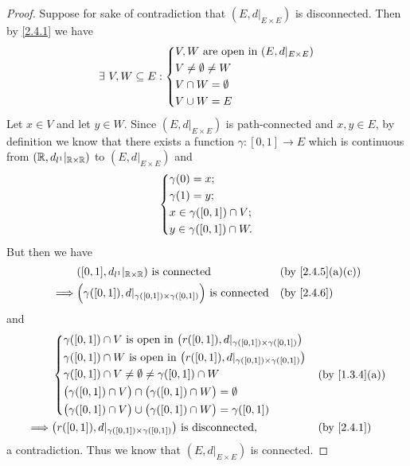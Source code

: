 \begin{proof}
  Suppose for sake of contradiction that \((E, d|_{E \times E})\) is disconnected.
  Then by \cref{2.4.1} we have
  \[
    \exists\ V, W \subseteq E : \begin{dcases}
      V, W \text{ are open in } (E, d|_{E \times E}) \\
      V \neq \emptyset \neq W                        \\
      V \cap W = \emptyset                           \\
      V \cup W = E
    \end{dcases}
  \]
  Let \(x \in V\) and let \(y \in W\).
  Since \((E, d|_{E \times E})\) is path-connected and \(x, y \in E\), by definition we know that there exists a function \(\gamma : [0, 1] \to E\) which is continuous from \((\mathbb{R}, d_{l^1}|_{\mathbb{R} \times \mathbb{R}})\) to \((E, d|_{E \times E})\) and
  \[
    \begin{dcases}
      \gamma(0) = x;               \\
      \gamma(1) = y;               \\
      x \in \gamma([0, 1]) \cap V; \\
      y \in \gamma([0, 1]) \cap W.
    \end{dcases}
  \]
  But then we have
  \begin{align*}
             & ([0, 1], d_{l^1}|_{\R \times \R}) \text{ is connected}                                   &  & \text{(by \cref{2.4.5}(a)(c))} \\
    \implies & \Big(\gamma([0, 1]), d|_{\gamma([0, 1]) \times \gamma([0, 1])}\Big) \text{ is connected} &  & \by{2.4.6}
  \end{align*}
  and
  \begin{align*}
             & \begin{dcases}
                 \gamma([0, 1]) \cap V \text{ is open in } \big(r([0, 1]), d|_{\gamma([0, 1]) \times \gamma([0, 1])}\big) \\
                 \gamma([0, 1]) \cap W \text{ is open in } \big(r([0, 1]), d|_{\gamma([0, 1]) \times \gamma([0, 1])}\big) \\
                 \gamma([0, 1]) \cap V \neq \emptyset \neq \gamma([0, 1]) \cap W                                          \\
                 \big(\gamma([0, 1]) \cap V\big) \cap \big(\gamma([0, 1]) \cap W\big) = \emptyset                         \\
                 \big(\gamma([0, 1]) \cap V\big) \cup \big(\gamma([0, 1]) \cap W\big) = \gamma([0, 1])
               \end{dcases} &  & \text{(by \cref{1.3.4}(a))}                    \\
    \implies & \big(r([0, 1]), d|_{\gamma([0, 1]) \times \gamma([0, 1])}\big) \text{ is disconnected},                                     &  & \by{2.4.1}
  \end{align*}
  a contradiction.
  Thus we know that \((E, d|_{E \times E})\) is connected.
\end{proof}

